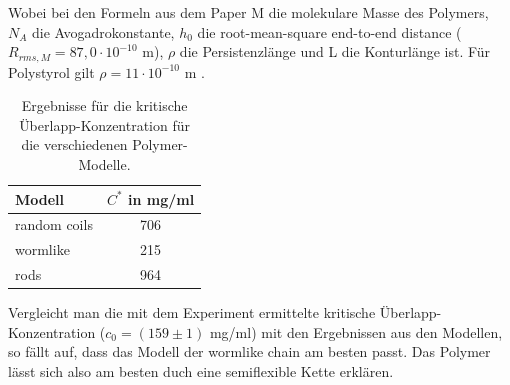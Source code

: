 Wobei bei den Formeln aus dem Paper M die molekulare Masse des Polymers, $N_A$ die Avogadrokonstante, $h_0$ die root-mean-square end-to-end distance ($R_{rms,M} = 87,0 \cdot 10^{-10}$ m), $\rho$ die Persistenzlänge und L die Konturlänge ist.
Für Polystyrol gilt $\rho = 11 \cdot 10^{-10}$ m \citep*{psPers}.

\begin{table}[h]
	\centering
	\begin{tabular}{l|c}
		Modell & $C^*$ in mg/ml\\ \hline
		random coils & 706 \\
		wormlike & 215\\
		rods & 964 \\
	\end{tabular}
	\caption{Ergebnisse für die kritische Überlapp-Konzentration für die verschiedenen Polymer-Modelle.}
\end{table}

Vergleicht man die mit dem Experiment ermittelte kritische Überlapp-Konzentration ($c_0 = (159 \pm 1)$ mg/ml) mit den Ergebnissen aus den Modellen, so fällt auf, dass das Modell der wormlike chain am besten passt. Das Polymer lässt sich also am besten duch eine semiflexible Kette erklären.


